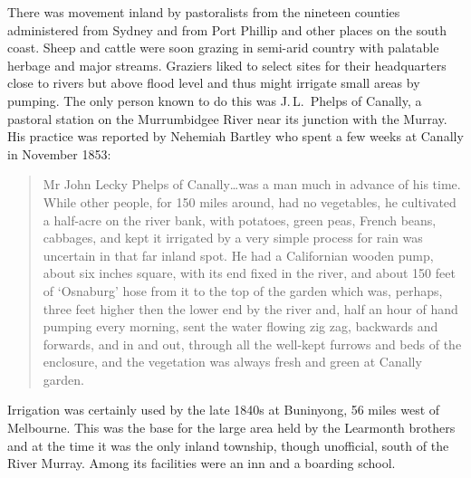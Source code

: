 There was movement inland by pastoralists from the nineteen counties
administered from Sydney and from Port Phillip and other places on the
south coast.  Sheep and cattle were soon grazing in semi-arid country
with palatable herbage and major streams.  Graziers liked to select
sites for their headquarters close to rivers but above flood level and
thus might irrigate small areas by pumping.  The only person known to
do this was J.\,L.~Phelps of Canally, a pastoral station on the
Murrumbidgee River near its junction with the Murray.  His practice
was reported by Nehemiah Bartley who spent a few weeks at Canally in
November 1853:
\begin{quote}
	Mr John Lecky Phelps of Canally\ldots was a man much in
	advance of his time.  While other people, for 150 miles
	around, had no vegetables, he cultivated a half-acre on the
	river bank, with potatoes, green peas, French beans, cabbages,
	and kept it irrigated by a very simple process for rain was
	uncertain in that far inland spot.  He had a Californian
	wooden pump, about six inches square, with its end fixed in
	the river, and about 150 feet of `Osnaburg' hose from it to
	the top of the garden which was, perhaps, three feet higher
	then the lower end by the river and, half an hour of hand
	pumping every morning, sent the water flowing zig zag,
	backwards and forwards, and in and out, through all the
	well-kept furrows and beds of the enclosure, and the
	vegetation was always fresh and green at Canally
	garden.
\end{quote}

Irrigation was certainly used by the late 1840s at Buninyong, 56 miles
west of Melbourne.  This was the base for the large area held by the
Learmonth brothers and at the time it was the only inland township,
though unofficial, south of the River Murray.  Among its facilities
were an inn and a boarding school.

